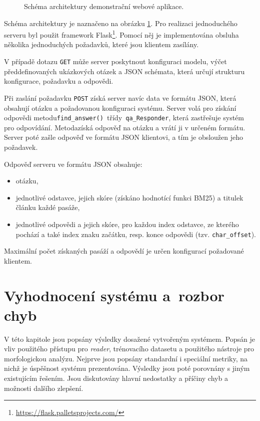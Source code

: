 \begin{figure}[hbt]
	\centering
	\caption{Schéma architektury demonstrační webové aplikace.}
	\label{web_demo_schema}
\end{figure}

Schéma architektury je naznačeno na obrázku \ref{web_demo_schema}. Pro realizaci jednoduchého serveru byl použit framework Flask\footnote{\url{https://flask.palletsprojects.com/}}. Pomocí něj je implementována obsluha několika jednoduchých požadavků, které jsou klientem zasílány.\par
\pagebreak
V případě dotazu \texttt{GET} může server poskytnout konfiguraci modelu, výčet předdefinovaných ukázkových otázek a JSON schémata, která určují strukturu konfigurace, požadavku a odpovědi.\par
Při zaslání požadavku \texttt{POST} získá server navíc data ve formátu JSON, která obsahují otázku a požadovanou konfiguraci systému. Server volá pro získání odpovědi metodu\linebreak \texttt{find\_answer() }třídy\texttt{ qa\_Responder}, která zastřešuje systém pro odpovídání. Metoda\linebreak získá odpověď na otázku a vrátí ji v určeném formátu. Server poté zašle odpověď ve formátu JSON klientovi, a tím je obsloužen jeho požadavek.\par
\noindent Odpověď serveru ve formátu JSON obsahuje: 
\begin{itemize}
\itemsep-0.1em 
    \item otázku,
    \item jednotlivé odstavce, jejich skóre (získáno hodnotící funkci BM25) a titulek článku každé pasáže,
    \item jednotlivé odpovědi a jejich skóre, pro každou index odstavce, ze kterého pochází a také index znaku začátku, resp. konce odpovědi (tzv. \texttt{char\_offset}).
\end{itemize}
Maximální počet získaných pasáží a odpovědí je určen konfigurací požadované klientem.


\chapter{Vyhodnocení systému a~rozbor chyb}
\label{system_evaluation}
V této kapitole jsou popsány výsledky dosažené vytvořeným systémem. Popsán je vliv použitého přístupu pro \emph{reader}, trénovacího datasetu a použitého nástroje pro morfologickou analýzu. Nejprve jsou popsány standardní i speciální metriky, na nichž je úspěšnost systému prezentována. Výsledky jsou poté porovnány s jiným existujícím řešením. Jsou diskutovány hlavní nedostatky a příčiny chyb a možnosti dalšího zlepšení.


